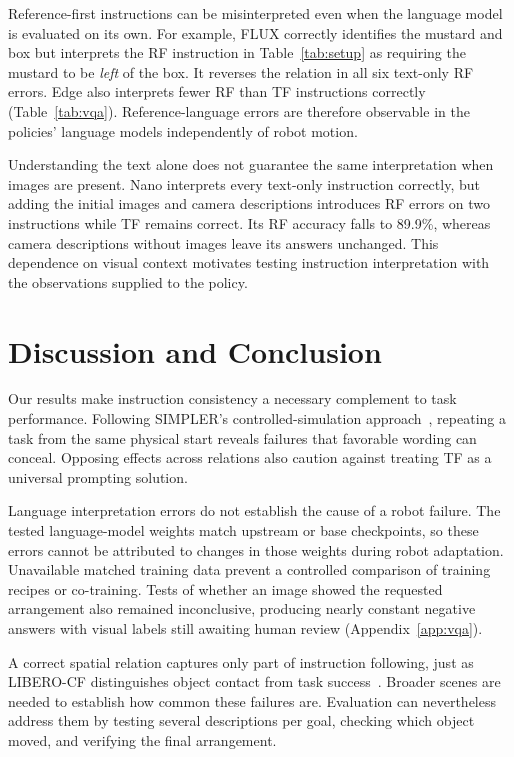 \documentclass{article}
\begin{document}
Reference-first instructions can be misinterpreted even when the language model is evaluated on its own. For example, FLUX correctly identifies the mustard and box but interprets the RF instruction in Table~\ref{tab:setup} as requiring the mustard to be \emph{left} of the box. It reverses the relation in all six text-only RF errors. Edge also interprets fewer RF than TF instructions correctly (Table~\ref{tab:vqa}). Reference-language errors are therefore observable in the policies' language models independently of robot motion.

Understanding the text alone does not guarantee the same interpretation when images are present. Nano interprets every text-only instruction correctly, but adding the initial images and camera descriptions introduces RF errors on two instructions while TF remains correct. Its RF accuracy falls to 89.9\%, whereas camera descriptions without images leave its answers unchanged. This dependence on visual context motivates testing instruction interpretation with the observations supplied to the policy.

\section{Discussion and Conclusion}
Our results make instruction consistency a necessary complement to task performance. Following SIMPLER's controlled-simulation approach~\citep{li2025simpler}, repeating a task from the same physical start reveals failures that favorable wording can conceal. Opposing effects across relations also caution against treating TF as a universal prompting solution.

Language interpretation errors do not establish the cause of a robot failure. The tested language-model weights match upstream or base checkpoints, so these errors cannot be attributed to changes in those weights during robot adaptation. Unavailable matched training data prevent a controlled comparison of training recipes or co-training. Tests of whether an image showed the requested arrangement also remained inconclusive, producing nearly constant negative answers with visual labels still awaiting human review (Appendix~\ref{app:vqa}).

A correct spatial relation captures only part of instruction following, just as LIBERO-CF distinguishes object contact from task success~\citep{fang2026counterfactual}. Broader scenes are needed to establish how common these failures are. Evaluation can nevertheless address them by testing several descriptions per goal, checking which object moved, and verifying the final arrangement.
\end{document}
